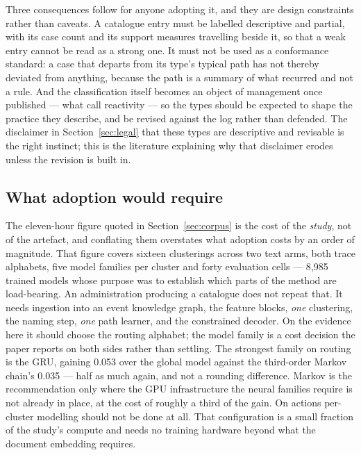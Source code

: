 Three consequences follow for anyone adopting it, and they are design constraints rather than
caveats. A catalogue entry must be labelled descriptive and partial, with its case count and its
support measures travelling beside it, so that a weak entry cannot be read as a strong one.
It must not be used as a conformance standard: a case that departs from its type's typical path
has not thereby deviated from anything, because the path is a summary of what recurred and not a
rule. And the classification itself becomes an object of management once published --- what
\citet{espeland2007rankings} call reactivity --- so the types should be expected to shape the
practice they describe, and be revised against the log rather than defended. The disclaimer in
Section~\ref{sec:legal} that these types are descriptive and revisable is the right instinct;
this is the literature explaining why that disclaimer erodes unless the revision is built in.

\subsection{What adoption would require}\label{sec:adoption}

The eleven-hour figure quoted in Section~\ref{sec:corpus} is the cost of the \emph{study}, not of
the artefact, and conflating them overstates what adoption costs by an order of magnitude. That
figure covers sixteen clusterings across two text arms, both trace alphabets, five model families
per cluster and forty evaluation cells --- 8{,}985 trained models whose purpose was to establish
which parts of the method are load-bearing. An administration producing a catalogue does not
repeat that. It needs ingestion into an event knowledge graph, the feature blocks, \emph{one}
clustering, the naming step, \emph{one} path learner, and the constrained decoder. On the
evidence here it should choose the routing alphabet; the model family is a cost decision the
paper reports on both sides rather than settling. The strongest family on routing is the GRU,
gaining 0.053 over the global model against the third-order Markov chain's 0.035 --- half as
much again, and not a rounding difference. Markov is the recommendation only where the GPU
infrastructure the neural families require is not already in place, at the cost of roughly a
third of the gain. On actions per-cluster modelling should not be done at all. That configuration is a small fraction
of the study's compute and needs no training hardware beyond what the document embedding
requires.

